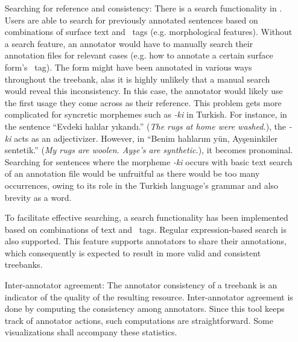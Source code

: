 \begin{itemize}[before=\normalfont, font=\itshape, align=left,noitemsep,topsep=0pt,parsep=3pt,partopsep=0pt,labelsep=3pt,align=left]
    \item[Searching for reference and consistency:]
        There is a search functionality in \boatvtwo.
        Users are able to search for previously annotated sentences based on combinations of surface text and \ud\ tags (e.g. morphological features).
		Without a search feature, an annotator would have to manually search their annotation files for relevant cases (e.g. how to annotate a certain surface form's \upos\ tag).
		The form might have been annotated in various ways throughout the treebank, alas it is highly unlikely that a manual search would reveal this inconsistency.
		In this case, the annotator would likely use the first usage they come across as their reference.
        This problem gets more complicated for syncretic morphemes such as \textit{-ki} in Turkish.
        For instance, in the sentence ``Evdeki halılar yıkandı.'' (\textit{The rugs at home were washed.}), the \textit{-ki} acts as an adjectivizer.
        However, in ``Benim halılarım yün, Ayşeninkiler sentetik.'' (\textit{My rugs are woolen. Ayşe's are synthetic.}), it becomes pronominal.
        Searching for sentences where the morpheme \textit{-ki} occurs with basic text search of an annotation file would be unfruitful as there would be too many occurrences, owing to its role in the Turkish language's grammar and also brevity as a word.

        To facilitate effective searching, a search functionality has been implemented based on combinations of text and \ud\ tags.
        Regular expression-based search is also supported.
        This feature supports annotators to share their annotations, which consequently is expected to result in more valid and consistent treebanks.

    \item[Inter-annotator agreement:]
        The annotator consistency of a treebank is an indicator of the quality of the resulting resource.
        Inter-annotator agreement is done by computing the consistency among annotators.
        Since this tool keeps track of annotator actions, such computations are straightforward.
        Some visualizations shall accompany these statistics.

\end{itemize}
